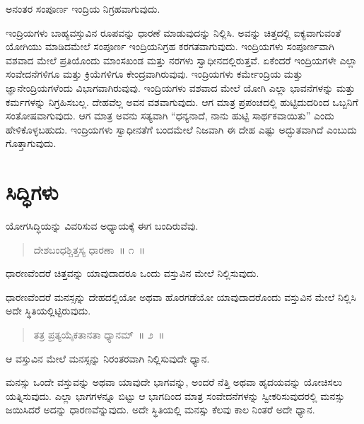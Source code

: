 ಅನಂತರ ಸಂಪೂರ್ಣ ಇಂದ್ರಿಯ ನಿಗ್ರಹವಾಗುವುದು. 

\vskip 3pt


ಇಂದ್ರಿಯಗಳು ಬಾಹ್ಯವಸ್ತುವಿನ ರೂಪವನ್ನು ಧಾರಣೆ ಮಾಡುವುದನ್ನು ನಿಲ್ಲಿಸಿ. ಅವನ್ನು ಚಿತ್ತದಲ್ಲಿ ಐಕ್ಯವಾಗುವಂತೆ ಯೋಗಿಯು ಮಾಡಿದಮೇಲೆ ಸಂಪೂರ್ಣ ಇಂದ್ರಿಯನಿಗ್ರಹ ಕರಗತವಾಗುವುದು. ಇಂದ್ರಿಯಗಳು ಸಂಪೂರ್ಣವಾಗಿ ವಶವಾದ ಮೇಲೆ ಪ್ರತಿಯೊಂದು ಮಾಂಸಖಂಡ ಮತ್ತು ನರಗಳು ಸ್ವಾಧೀನದಲ್ಲಿರುತ್ತವೆ. ಏಕೆಂದರೆ ಇಂದ್ರಿಯಗಳೇ ಎಲ್ಲಾ ಸಂವೇದನೆಗಳಿಗೂ ಮತ್ತು ಕ್ರಿಯೆಗಳಿಗೂ ಕೇಂದ್ರವಾಗಿರುವುವು. ಇಂದ್ರಿಯಗಳು ಕರ್ಮೇಂದ್ರಿಯ ಮತ್ತು ಜ್ಞಾನೇಂದ್ರಿಯಗಳೆಂದು ವಿಭಾಗವಾಗಿರುವುವು. ಇಂದ್ರಿಯಗಳು ವಶವಾದ ಮೇಲೆ ಯೋಗಿ ಎಲ್ಲಾ ಭಾವನೆಗಳನ್ನು ಮತ್ತು ಕರ್ಮಗಳನ್ನು ನಿಗ್ರಹಿಸಬಲ್ಲ. ದೇಹವೆಲ್ಲ ಅವನ ವಶವಾಗುವುದು. ಆಗ ಮಾತ್ರ ಪ್ರಪಂಚದಲ್ಲಿ ಹುಟ್ಟಿದುದರಿಂದ ಒಬ್ಬನಿಗೆ ಸಂತೋಷವಾಗುವುದು. ಆಗ ಮಾತ್ರ ಅವನು ಸತ್ಯವಾಗಿ “ಧನ್ಯನಾದೆ, ನಾನು ಹುಟ್ಟಿ ಸಾರ್ಥಕವಾಯಿತು” ಎಂದು ಹೇಳಿಕೊಳ್ಳಬಹುದು. ಇಂದ್ರಿಯಗಳು ಸ್ವಾಧೀನತೆಗೆ ಬಂದಮೇಲೆ ನಿಜವಾಗಿ ಈ ದೇಹ ಎಷ್ಟು ಅದ್ಭುತವಾಗಿದೆ ಎಂಬುದು ಗೊತ್ತಾಗುವುದು.

\chapter{ಸಿದ್ಧಿಗಳು}%

ಯೋಗಸಿದ್ಧಿಯನ್ನು ವಿವರಿಸುವ ಅಧ್ಯಾಯಕ್ಕೆ ಈಗ ಬಂದಿರುವೆವು. 

\vspace{-0.36cm}

\begin{verse}
ದೇಶಬಂಧಶ್ಚಿತ್ತಸ್ಯ ಧಾರಣಾ~॥ ೧~॥
\end{verse}

\vspace{-0.4cm}

ಧಾರಣವೆಂದರೆ ಚಿತ್ತವನ್ನು ಯಾವುದಾದರೂ ಒಂದು ವಸ್ತುವಿನ ಮೇಲೆ ನಿಲ್ಲಿಸುವುದು. 

ಧಾರಣವೆಂದರೆ ಮನಸ್ಸನ್ನು ದೇಹದಲ್ಲಿಯೋ ಅಥವಾ ಹೊರಗಡೆಯೋ ಯಾವುದಾದರೊಂದು ವಸ್ತುವಿನ ಮೇಲೆ ನಿಲ್ಲಿಸಿ ಅದೇ ಸ್ಥಿತಿಯಲ್ಲಿಟ್ಟಿರುವುದು. 

\vspace{-0.36cm}

\begin{verse}
ತತ್ರ ಪ್ರತ್ಯಯೈಕತಾನತಾ ಧ್ಯಾನಮ್​~॥ ೨~॥
\end{verse}

\vspace{-0.4cm}

ಆ ವಸ್ತುವಿನ ಮೇಲೆ ಮನಸ್ಸನ್ನು ನಿರಂತರವಾಗಿ ನಿಲ್ಲಿಸುವುದೇ ಧ್ಯಾನ. 

ಮನಸ್ಸು ಒಂದೇ ವಸ್ತುವನ್ನು ಅಥವಾ ಯಾವುದೇ ಭಾಗವನ್ನು, ಅಂದರೆ ನೆತ್ತಿ ಅಥವಾ ಹೃದಯವನ್ನು ಯೋಚಿಸಲು ಯತ್ನಿಸುವುದು. ಎಲ್ಲಾ ಭಾಗಗಳನ್ನೂ ಬಿಟ್ಟು ಆ ಭಾಗದಿಂದ ಮಾತ್ರ ಸಂವೇದನೆಗಳನ್ನು ಸ್ವೀಕರಿಸುವುದರಲ್ಲಿ ಮನಸ್ಸು ಜಯಿಸಿದರೆ ಅದನ್ನು ಧಾರಣವೆನ್ನುವುದು. ಅದೇ ಸ್ಥಿತಿಯಲ್ಲಿ ಮನಸ್ಸು ಕೆಲವು ಕಾಲ ನಿಂತರೆ ಅದೇ ಧ್ಯಾನ. 

